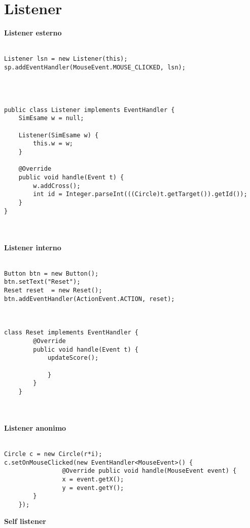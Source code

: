 \documentclass[10pt,a4paper]{article}
\begin{document}
\section{Listener}
\textbf{Listener esterno}\\\\
\begin{verbatim}
Listener lsn = new Listener(this);
sp.addEventHandler(MouseEvent.MOUSE_CLICKED, lsn);

\end{verbatim}
\\\\
\begin{verbatim}
public class Listener implements EventHandler {
    SimEsame w = null;
     
    Listener(SimEsame w) {
        this.w = w;
    }
    
    @Override
    public void handle(Event t) {
        w.addCross();
        int id = Integer.parseInt(((Circle)t.getTarget()).getId());
    }
}

\end{verbatim}
\\\\
\textbf{Listener interno}\\\\
\begin{verbatim}
Button btn = new Button();
btn.setText("Reset");
Reset reset  = new Reset();
btn.addEventHandler(ActionEvent.ACTION, reset);



class Reset implements EventHandler {
        @Override
        public void handle(Event t) {
            updateScore();
                
            }
        }
    }

\end{verbatim}
\\\\
\textbf{Listener anonimo}\\\\
\begin{verbatim}
Circle c = new Circle(r*i);
c.setOnMouseClicked(new EventHandler<MouseEvent>() {
                @Override public void handle(MouseEvent event) {
                x = event.getX();
                y = event.getY();
        }
    });

\end{verbatim}
\newpage
\textbf{Self listener}\\\\
\end{document}
